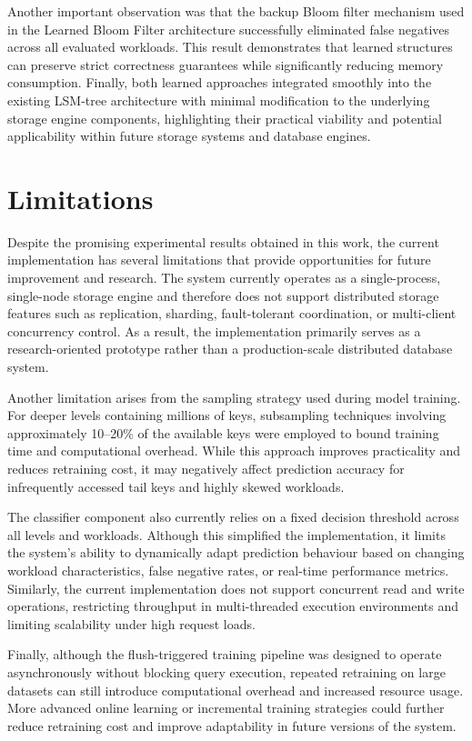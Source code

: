 \documentclass{mnitjaipur}
\begin{document}
Another important observation was that the backup Bloom filter mechanism used in the Learned Bloom Filter architecture successfully eliminated false negatives across all evaluated workloads. This result demonstrates that learned structures can preserve strict correctness guarantees while significantly reducing memory consumption. Finally, both learned approaches integrated smoothly into the existing LSM-tree architecture with minimal modification to the underlying storage engine components, highlighting their practical viability and potential applicability within future storage systems and database engines.

\section{Limitations}

Despite the promising experimental results obtained in this work, the current implementation has several limitations that provide opportunities for future improvement and research. The system currently operates as a single-process, single-node storage engine and therefore does not support distributed storage features such as replication, sharding, fault-tolerant coordination, or multi-client concurrency control. As a result, the implementation primarily serves as a research-oriented prototype rather than a production-scale distributed database system.

Another limitation arises from the sampling strategy used during model training. For deeper levels containing millions of keys, subsampling techniques involving approximately 10--20\% of the available keys were employed to bound training time and computational overhead. While this approach improves practicality and reduces retraining cost, it may negatively affect prediction accuracy for infrequently accessed tail keys and highly skewed workloads.

The classifier component also currently relies on a fixed decision threshold across all levels and workloads. Although this simplified the implementation, it limits the system's ability to dynamically adapt prediction behaviour based on changing workload characteristics, false negative rates, or real-time performance metrics. Similarly, the current implementation does not support concurrent read and write operations, restricting throughput in multi-threaded execution environments and limiting scalability under high request loads.

Finally, although the flush-triggered training pipeline was designed to operate asynchronously without blocking query execution, repeated retraining on large datasets can still introduce computational overhead and increased resource usage. More advanced online learning or incremental training strategies could further reduce retraining cost and improve adaptability in future versions of the system.
\end{document}
